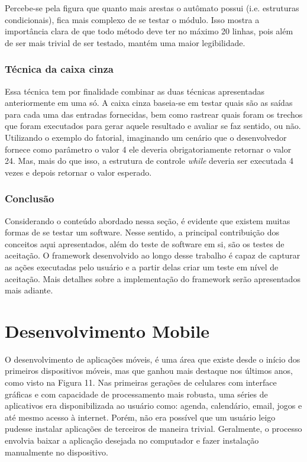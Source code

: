 \documentclass[
    12pt,       %
    openright,      %
    twoside,      %
    a4paper,      %
    english,      %
    french,       %
    spanish,      %
    brazil,       %
    ]{abntex2}
\begin{document}
              Percebe-se pela figura que quanto mais arestas o autômato possui (i.e. estruturas
              condicionais), fica mais complexo de se testar o módulo. Isso mostra a importância clara de
              que todo método deve ter no máximo 20 linhas, pois além de ser mais trivial de ser testado,
              mantém uma maior legibilidade.

          \subsection{Técnica da caixa cinza}
              Essa técnica tem por finalidade combinar as duas técnicas apresentadas anteriormente em uma
              só. A caixa cinza baseia-se em testar quais são as saídas para cada uma das entradas
              fornecidas, bem como rastrear quais foram os trechos que foram executados para gerar aquele
              resultado e avaliar se faz sentido, ou não. Utilizando o exemplo do fatorial, imaginando
              um cenário que o desenvolvedor fornece como parâmetro o valor 4 ele deveria obrigatoriamente
              retornar o valor 24. Mas, mais do que isso, a estrutura de controle \textit{while} deveria
              ser executada 4 vezes e depois retornar o valor esperado.

            \subsection{Conclusão}
              Considerando o conteúdo abordado nessa seção, é evidente que existem muitas formas de se testar um
              software. Nesse sentido, a principal contribuição dos conceitos aqui apresentados, além do
              teste de software em si, são os testes de aceitação. O framework desenvolvido ao longo
              desse trabalho é capaz de capturar as ações executadas pelo usuário e a partir delas criar
              um teste em nível de aceitação. Mais detalhes sobre a implementação do framework serão apresentados
              mais adiante.

  \chapter{Desenvolvimento Mobile}

      O desenvolvimento de aplicações móveis, é uma área que existe desde o início dos
      primeiros dispositivos móveis, mas que ganhou mais destaque nos últimos anos, como visto na
      Figura 11. Nas primeiras gerações de celulares com interface gráficas e com capacidade
      de processamento mais robusta, uma séries de aplicativos era disponibilizada ao usuário como:
      agenda, calendário, email, jogos e até mesmo acesso à internet. Porém, não era possível que
      um usuário leigo pudesse instalar aplicações de terceiros de maneira trivial. Geralmente, o
      processo envolvia baixar a aplicação desejada no computador e fazer instalação manualmente
      no dispositivo.
\end{document}
